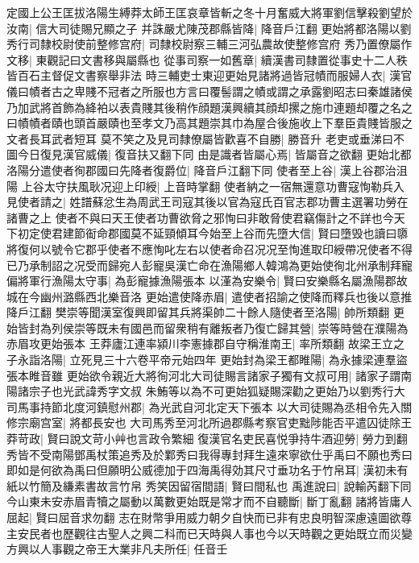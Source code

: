 定國上公王匡拔洛陽生縛莽太師王匡哀章皆斬之冬十月奮威大將軍劉信擊殺劉望於汝南|{
	信大司徒賜兄顯之子}
并誅嚴尤陳茂郡縣皆降|{
	降音戶江翻}
更始將都洛陽以劉秀行司隸校尉使前整修宫府|{
	司隸校尉察三輔三河弘農故使整修宫府}
秀乃置僚屬作文移|{
	東觀記曰文書移與屬縣也}
從事司察一如舊章|{
	續漢書司隸置從事史十二人秩皆百石主督促文書察舉非法}
時三輔吏士東迎更始見諸將過皆冠幘而服婦人衣|{
	漢官儀曰幘者古之卑賤不冠者之所服也方言曰覆髻謂之幘或謂之承露劉昭志曰秦雄諸侯乃加武將首飾為絳袙以表貴賤其後稍作顔題漢興續其顔却摞之施巾連題却覆之名之曰幘幘者賾也頭首嚴賾也至孝文乃高其題崇其巾為屋合後施收上下羣臣貴賤皆服之文者長耳武者短耳}
莫不笑之及見司隸僚屬皆歡喜不自勝|{
	勝音升}
老吏或垂涕曰不圖今日復見漢官威儀|{
	復音扶又翻下同}
由是識者皆屬心焉|{
	皆屬音之欲翻}
更始北都洛陽分遣使者徇郡國曰先降者復爵位|{
	降音戶江翻下同}
使者至上谷|{
	漢上谷郡治沮陽}
上谷太守扶風耿况迎上印綬|{
	上音時掌翻}
使者納之一宿無還意功曹寇恂勒兵入見使者請之|{
	姓譜蘇忿生為周武王司寇其後以官為寇氏百官志郡功曹主選署功勞在諸曹之上}
使者不與曰天王使者功曹欲脅之邪恂曰非敢脅使君竊傷計之不詳也今天下初定使君建節䘖命郡國莫不延頸傾耳今始至上谷而先墮大信|{
	賢曰墮毁也讀曰隳}
將復何以號令它郡乎使者不應恂叱左右以使者命召况况至恂進取印綬帶况使者不得已乃承制詔之况受而歸宛人彭寵吳漢亡命在漁陽鄉人韓鴻為更始使徇北州承制拜寵偏將軍行漁陽太守事|{
	為彭寵據漁陽張本}
以漌為安樂令|{
	賢曰安樂縣名屬漁陽郡故城在今幽州潞縣西北樂音洛}
更始遣使降赤眉|{
	遣使者招諭之使降而釋兵也後以意推降戶江翻}
樊崇等聞漢室復興即留其兵將渠帥二十餘人隨使者至洛陽|{
	帥所類翻}
更始皆封為列侯崇等既未有國邑而留衆稍有離叛者乃復亡歸其營|{
	崇等時營在濮陽為赤眉攻更始張本}
王莽廬江連率潁川李憲據郡自守稱淮南王|{
	率所類翻}
故梁王立之子永詣洛陽|{
	立死見三十六卷平帝元始四年}
更始封為梁王都睢陽|{
	為永據梁連羣盜張本睢音雖}
更始欲令親近大將徇河北大司徒賜言諸家子獨有文叔可用|{
	諸家子謂南陽諸宗子也光武諱秀字文叔}
朱鮪等以為不可更始狐疑賜深勸之更始乃以劉秀行大司馬事持節北度河鎮慰州郡|{
	為光武自河北定天下張本}
以大司徒賜為丞相令先入關修宗廟宫室|{
	將都長安也}
大司馬秀至河北所過郡縣考察官吏黜陟能否平遣囚徒除王莽苛政|{
	賢曰說文苛小艸也言政令繁細}
復漢官名吏民喜悦爭持牛酒迎勞|{
	勞力到翻}
秀皆不受南陽鄧禹杖策追秀及於鄴秀曰我得專封拜生遠來寧欲仕乎禹曰不願也秀曰即如是何欲為禹曰但願明公威德加于四海禹得効其尺寸垂功名于竹帛耳|{
	漢初未有紙以竹簡及縑素書故言竹帛}
秀笑因留宿間語|{
	賢曰間私也}
禹進說曰|{
	說輸芮翻下同}
今山東未安赤眉青犢之屬動以萬數更始既是常才而不自聽斷|{
	斷丁亂翻}
諸將皆庸人屈起|{
	賢曰屈音求勿翻}
志在財幣爭用威力朝夕自快而已非有忠良明智深慮遠圖欲尊主安民者也歷觀往古聖人之興二科而已天時與人事也今以天時觀之更始既立而災變方興以人事觀之帝王大業非凡夫所任|{
	任音壬}
